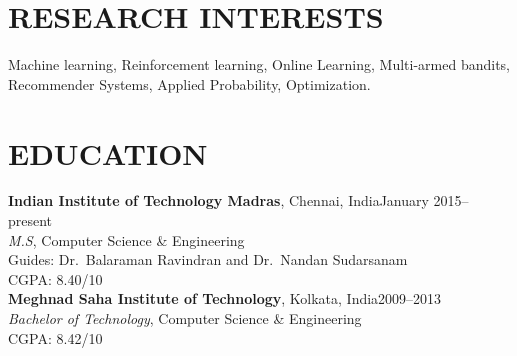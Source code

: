 \documentclass[margin,11pt]{res}
\begin{document}
\begin{resume}

\section{RESEARCH INTERESTS}

Machine learning, Reinforcement learning, Online Learning, Multi-armed bandits, Recommender Systems, Applied Probability, Optimization.

%


\section{EDUCATION}
\textbf{Indian Institute of Technology Madras}, Chennai, India\hfill January 2015--present\\
{\sl M.S}, Computer Science \& Engineering
\\Guides: Dr.~Balaraman Ravindran and Dr.~Nandan Sudarsanam\\CGPA: 8.40/10
\\[0.25cm]
\textbf{Meghnad Saha Institute of Technology}, Kolkata, India\hfill 2009--2013\\
{\sl Bachelor of Technology}, Computer Science \& Engineering\\ CGPA: 8.42/10

\end{resume}
\end{document}
